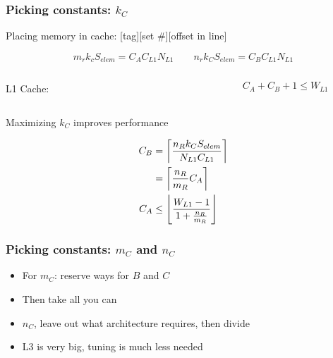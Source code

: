 \documentclass{beamer}
\DeclarePairedDelimiter\ceil{\lceil}{\rceil}
\DeclarePairedDelimiter\floor{\lfloor}{\rfloor}
\begin{document}
\begin{frame}
  \frametitle{Picking constants: $k_C$}
  Placing memory in cache: [tag][set \#][offset in line]

  \begin{equation*}
    m_rk_cS_{elem} = C_AC_{L1}N_{L1} \qquad n_rk_CS_{elem} = C_BC_{L1}N_{L1}
  \end{equation*}

  \begin{columns}
    \begin{column}{0.1\textwidth}
      L1 Cache:
    \end{column}
    \begin{column}{0.5\textwidth}
      \centering
    \end{column}
    \begin{column}{0.25\textwidth}
      \begin{equation*}
        C_A + C_B + 1 \leq W_{L1}
      \end{equation*}
    \end{column}
  \end{columns}
  \begin{center}
    Maximizing $k_C$ improves performance
  \end{center}

  \begin{align*}
    C_B &= \ceil*{\frac{n_Rk_CS_{elem}}{N_{L1}C_{L1}}}\\
        &= \ceil*{\frac{n_R}{m_R}C_A}\\
    C_A &\leq \floor*{\frac{W_{L1} - 1}{1 + \frac{n_R}{m_R}}}
  \end{align*}
\end{frame}

\begin{frame}
  \frametitle{Picking constants: $m_C$ and $n_C$}
  \begin{itemize}
  \item For $m_C$: reserve ways for $B$ and $C$
  \item Then take all you can
  \item $n_C$, leave out what architecture requires, then divide
  \item L3 is very big, tuning is much less needed
  \end{itemize}
\end{frame}
\end{document}
